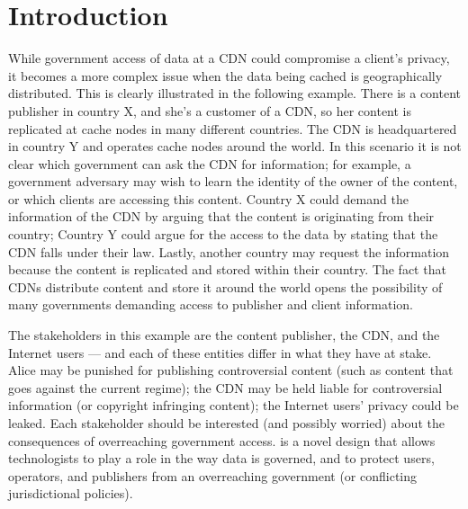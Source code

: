 \section{Introduction}
\label{sec:intro}

While government access of data at a CDN could compromise a client's privacy, it becomes a more complex issue when the data being cached is geographically 
distributed. This is clearly illustrated in the following example.  There is a content publisher in 
country X, and she's a customer of a CDN, so her content is replicated at cache nodes in many 
different countries.  The CDN is headquartered 
in country Y and operates cache nodes around the world.  In this scenario it is not clear which government can ask the CDN for information; for 
example, a government adversary may wish to learn the identity of the owner of the content, or which clients are accessing 
this content.  Country X could demand the information of the CDN by arguing that the content is originating 
from their country; Country Y could argue for the access to the data by stating that the CDN falls under their 
law.  Lastly, another country may request the information because the content is replicated and stored within 
their country.  The fact that CDNs distribute content and store it around the world opens the possibility of 
many governments demanding access to publisher and client information.

The stakeholders in this 
example are the content publisher, the CDN, and the Internet users --- and each of these entities differ in what 
they have at stake.  Alice may be punished for publishing controversial content (such as content that 
goes against the current regime); the CDN 
may be held liable for controversial information (or copyright infringing content); the Internet users' 
privacy could be leaked.  Each stakeholder should be interested (and possibly worried) about the 
consequences of overreaching government access.  \system{} is a novel design that allows technologists to play 
a role in the way data is governed, and to protect users, operators, and publishers from an overreaching government (or 
conflicting jurisdictional policies).
